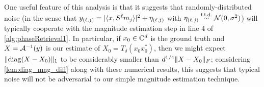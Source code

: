 One useful feature of this analysis is that it suggests that randomly-distributed noise (in the sense that $y_{(\ell, j)} = \lvert\langle x, S^\ell m_j\rangle\rvert^2 + \eta_{(\ell, j)}$ with $\eta_{(\ell, j)} \overset{\text{i.i.d.}}{\sim} \mathcal{N}(0, \sigma^2)$) will typically cooperate with the magnitude estimation step in line 4 of \cref{alg:phaseRetrieval1}.  In particular, if $x_0 \in \mathbb{C}^d$ is the ground truth and $X = \mathcal{A}^{-1}(y)$ is our estimate of $X_0 = T_\delta(x_0 x_0^*)$, then we might expect $\lVert\operatorname{diag}(X - X_0)\rVert_1$ to be considerably smaller than $d^{1 / 4} \lVert X - X_0\rVert_F$; considering \cref{lem:diag_mag_diff} along with these numerical results, this suggests that typical noise will not be adversarial to our simple magnitude estimation technique.


